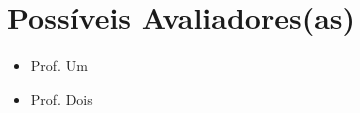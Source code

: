 \section*{Possíveis Avaliadores(as)}

\begin{itemize}
    \item Prof. Um
    \item Prof. Dois
\end{itemize}